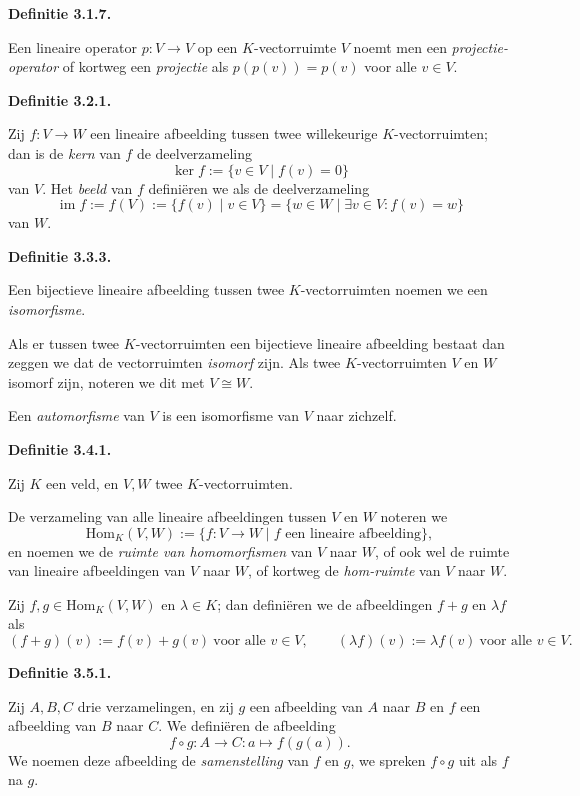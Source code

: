 \documentclass[10pt,a4paper]{article}
\newenvironment{res}[1]{%
  \par\noindent\textbf{Definitie #1.}~\ignorespaces
}{%
  \par\vspace{2pt}\normalfont
}
\begin{document}
\begin{res}{3.1.7}
Een lineaire operator $p:V\to V$ op een $K$-vectorruimte $V$ noemt men een \textit{projectie-operator} of kortweg een \textit{projectie} als $p(p(v))=p(v)$ voor alle $v\in V$.
\end{res}

\begin{res}{3.2.1}
Zij $f:V\to W$ een lineaire afbeelding tussen twee willekeurige $K$-vectorruimten; dan is de \textit{kern} van $f$ de deelverzameling
\[
\ker f:=\{v\in V\mid f(v)=0\}
\]
van $V$. Het \textit{beeld} van $f$ defini\"eren we als de deelverzameling
\[
\operatorname{im} f:=f(V):=\{f(v)\mid v\in V\}=\{w\in W\mid \exists v\in V: f(v)=w\}
\]
van $W$.
\end{res}

\begin{res}{3.3.3}
\begin{myenum}
\item Een bijectieve lineaire afbeelding tussen twee $K$-vectorruimten noemen we een \textit{isomorfisme}.
\item Als er tussen twee $K$-vectorruimten een bijectieve lineaire afbeelding bestaat dan zeggen we dat de vectorruimten \textit{isomorf} zijn. Als twee $K$-vectorruimten $V$ en $W$ isomorf zijn, noteren we dit met $V\cong W$.
\item Een \textit{automorfisme} van $V$ is een isomorfisme van $V$ naar zichzelf.
\end{myenum}
\end{res}

\begin{res}{3.4.1}
Zij $K$ een veld, en $V,W$ twee $K$-vectorruimten.
\begin{myenum}
\item De verzameling van alle lineaire afbeeldingen tussen $V$ en $W$ noteren we
\[
\mathrm{Hom}_K(V,W):=\{f:V\to W \mid f \text{ een lineaire afbeelding}\},
\]
en noemen we de \textit{ruimte van homomorfismen} van $V$ naar $W$, of ook wel de ruimte van lineaire afbeeldingen van $V$ naar $W$, of kortweg de \textit{hom-ruimte} van $V$ naar $W$.
\item Zij $f,g\in\mathrm{Hom}_K(V,W)$ en $\lambda\in K$; dan defini\"eren we de afbeeldingen $f+g$ en $\lambda f$ als
\[
(f+g)(v):=f(v)+g(v) \ \text{voor alle } v\in V, \qquad (\lambda f)(v):=\lambda f(v) \ \text{voor alle } v\in V.
\]
\end{myenum}
\end{res}

\begin{res}{3.5.1}
Zij $A,B,C$ drie verzamelingen, en zij $g$ een afbeelding van $A$ naar $B$ en $f$ een afbeelding van $B$ naar $C$. We defini\"eren de afbeelding
\[
f\circ g:A\to C:a\mapsto f(g(a)).
\]
We noemen deze afbeelding de \textit{samenstelling} van $f$ en $g$, we spreken $f\circ g$ uit als $f$ na $g$.
\end{res}
\end{document}
